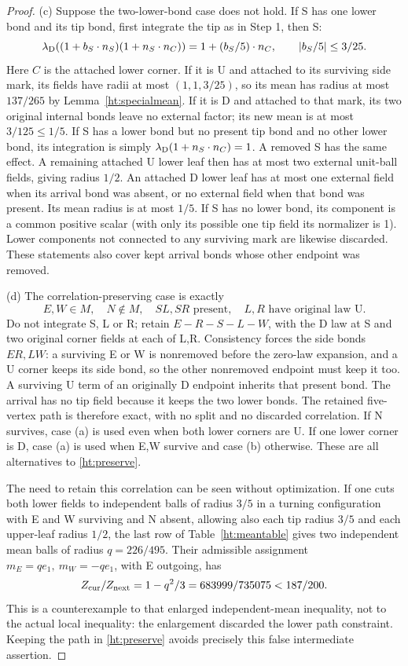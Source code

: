\begin{proof}
(c) Suppose the two-lower-bond case does not hold. If S has one lower
bond and its tip bond, first integrate the tip as in Step 1, then S:
\begin{equation}\label{ht:arrivaltip}
 \lambda_{\mathrm D}((1+b_S\cdot n_S)(1+n_S\cdot n_C))
       =1+(b_S/5)\cdot n_C,\qquad |b_S/5|\le3/25.
\end{equation}
Here \(C\) is the attached lower corner. If it is U and attached to
its surviving side mark, its fields have radii at most \((1,1,3/25)\),
so its mean has radius at most \(137/265\) by
Lemma~\ref{ht:specialmean}. If it is D and attached to that mark,
its two original internal bonds leave no external factor; its new
mean is at most \(3/125\le1/5\).
If S has a lower bond but no present tip bond and no other lower bond,
its integration is simply \(\lambda_{\mathrm D}(1+n_S\cdot n_C)=1\).
A removed S has the same effect. A remaining attached U lower leaf
then has at most two external unit-ball fields, giving radius \(1/2\).
An attached D lower leaf has at most one external field when its
arrival bond was absent, or no external field when that bond was
present. Its mean radius is at most \(1/5\). If S has no lower bond,
its component is a common positive scalar (with only its possible
one tip field its normalizer is 1). Lower components not connected
to any surviving mark are likewise discarded. These statements also
cover kept arrival bonds whose other endpoint was removed.

(d) The correlation-preserving case is exactly
\begin{equation}\label{ht:preserve}
 E,W\in M,\quad N\notin M,\quad SL,SR\text{ present},\quad
 L,R\text{ have original law U}.
\end{equation}
Do not integrate S, L or R; retain
\(E-R-S-L-W\), with the D law at S and two original corner fields
at each of L,R. Consistency forces the side bonds \(ER,LW\):
a surviving E or W is nonremoved before the zero-law expansion, and
a U corner keeps its side bond, so the other nonremoved endpoint
must keep it too. A surviving U term of an originally D endpoint
inherits that present bond. The arrival has no tip field because it
keeps the two lower bonds. The retained five-vertex path is therefore
exact, with no split and no discarded correlation. If N survives,
case (a) is used even when both lower corners are U. If one lower
corner is D, case (a) is used when E,W survive and case (b) otherwise.
These are all alternatives to \eqref{ht:preserve}.

The need to retain this correlation can be seen without optimization.
If one cuts both lower fields to independent balls of radius \(3/5\)
in a turning configuration with E and W surviving and N absent, allowing
also each tip radius \(3/5\) and each upper-leaf radius \(1/2\),
the last row of Table~\ref{ht:meantable} gives two independent mean
balls of radius \(q=226/495\). Their admissible assignment
\(m_E=qe_1,\ m_W=-qe_1\), with E outgoing, has
\[
 Z_{\rm cur}/Z_{\rm next}=1-q^2/3=683999/735075<187/200.
\]
This is a counterexample to that enlarged independent-mean inequality,
not to the actual local inequality: the enlargement discarded the lower
path constraint. Keeping the path in \eqref{ht:preserve} avoids precisely
this false intermediate assertion.


\end{proof}
